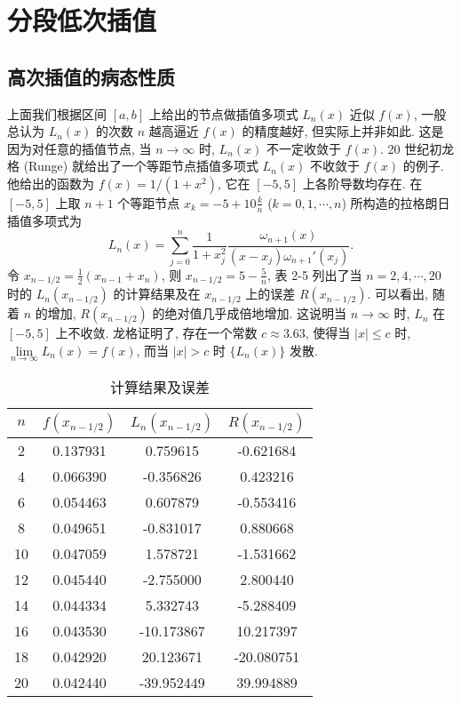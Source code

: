 \documentclass[../../main.tex]{subfiles}
\begin{document}
\section{分段低次插值}

\subsection{高次插值的病态性质}\label{高次插值导致的龙格现象}

上面我们根据区间 $[a, b]$ 上给出的节点做插值多项式 $L_n(x)$ 近似 $f(x)$, 一般总认为 $L_n(x)$ 的次数 $n$ 越高逼近 $f(x)$ 的精度越好, 但实际上并非如此. 这是因为对任意的插值节点, 当 $n \to \infty$ 时, $L_n(x)$ 不一定收敛于 $f(x)$. 20 世纪初龙格 (Runge) 就给出了一个等距节点插值多项式 $L_n(x)$ 不收敛于 $f(x)$ 的例子. 他给出的函数为 $f(x) = 1/(1 + x^2)$, 它在 $[-5, 5]$ 上各阶导数均存在. 在 $[-5, 5]$ 上取 $n + 1$ 个等距节点 $x_k = -5 + 10 \frac{k}{n}$ ($k = 0, 1, \cdots, n$) 所构造的拉格朗日插值多项式为
\[
L_n(x) = \sum_{j=0}^n \frac{1}{1 + x_j^2} \frac{\omega_{n+1}(x)}{(x - x_j) \omega_{n+1}'(x_j)}.
\]
令 $x_{n - 1/2} = \frac{1}{2}(x_{n - 1} + x_n)$, 则 $x_{n - 1/2} = 5 - \frac{5}{n}$, 表 2-5 列出了当 $n = 2, 4, \cdots, 20$ 时的 $L_n(x_{n - 1/2})$ 的计算结果及在 $x_{n - 1/2}$ 上的误差 $R(x_{n - 1/2})$. 可以看出, 随着 $n$ 的增加, $R(x_{n - 1/2})$ 的绝对值几乎成倍地增加. 这说明当 $n \to \infty$ 时, $L_n$ 在 $[-5, 5]$ 上不收敛. 龙格证明了, 存在一个常数 $c \approx 3.63$, 使得当 $|x| \leqslant c$ 时, $\lim\limits_{n \to \infty} L_n(x) = f(x)$, 而当 $|x| > c$ 时 $\{L_n(x)\}$ 发散.
\begin{table}[H]
\centering
\caption{计算结果及误差}
\begin{tabular}{c|c|c|c}
\toprule
$n$ & $f(x_{n - 1/2})$ & $L_n(x_{n - 1/2})$ & $R(x_{n - 1/2})$ \\
\midrule
2  & 0.137931 & 0.759615   & -0.621684  \\
4  & 0.066390 & -0.356826  & 0.423216   \\
6  & 0.054463 & 0.607879   & -0.553416  \\
8  & 0.049651 & -0.831017  & 0.880668   \\
10 & 0.047059 & 1.578721   & -1.531662  \\
12 & 0.045440 & -2.755000  & 2.800440   \\
14 & 0.044334 & 5.332743   & -5.288409 \\
16 & 0.043530 & -10.173867 & 10.217397  \\
18 & 0.042920 & 20.123671  & -20.080751 \\
20 & 0.042440 & -39.952449 & 39.994889  \\
\bottomrule
\end{tabular}
\end{table}
\end{document}
